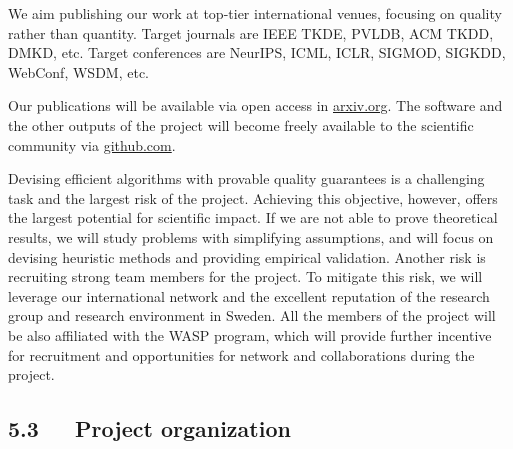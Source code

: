 \documentclass[a4paper,11pt]{article}
\begin{document}
We aim publishing our work at top-tier international venues, 
focusing on quality rather than quantity.
% 
Target journals 
are IEEE TKDE, PVLDB, ACM TKDD,  DMKD, etc. 
Target conferences are NeurIPS, ICML, ICLR, SIGMOD, SIGKDD, WebConf, WSDM, etc.

Our publications will be available via open access in {\small\url{arxiv.org}}. 
The software and the other outputs of the project 
will become freely available to the scientific community via {\small\url{github.com}}. %

\newpage
{}
Devising efficient algorithms with provable quality guarantees is a challenging task
and the largest risk of the project. 
Achieving this objective, however, offers the largest potential for scientific impact.
If we are not able to prove theoretical results, 
we will study problems with simplifying assumptions, and 
will focus on devising heuristic methods and providing empirical validation.
Another risk is recruiting strong team members for the project. 
To mitigate this risk, we will leverage our international network
and the excellent reputation of the research group and research environment in Sweden. 
All the members of the project will be also affiliated with the WASP program, 
which will provide further incentive for recruitment and opportunities 
for network and collaborations during the project.


\subsection*{5.3~~~Project organization}

\end{document}
